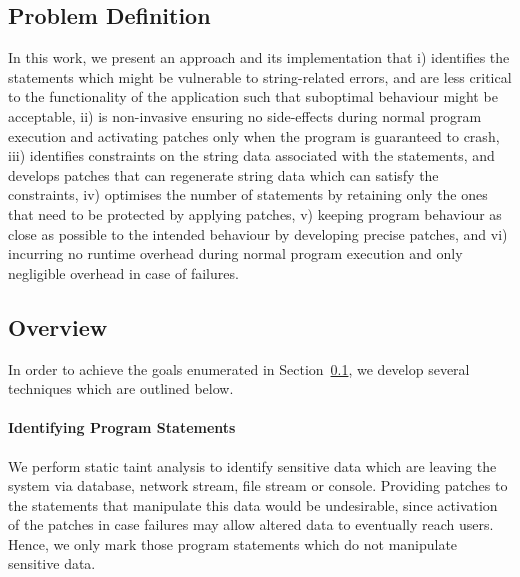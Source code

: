 \subsection{Problem Definition}
\label{subsec:problem}

In this work, we present an approach and its implementation that i) identifies the statements which might be vulnerable to string-related errors,
and are less critical to the functionality of the application such that suboptimal behaviour might be acceptable, ii) is non-invasive ensuring no 
side-effects during normal program execution and activating patches only when the program is guaranteed to crash, iii) identifies constraints on the string
data associated with the statements, and develops patches that can regenerate string data which can satisfy the constraints, iv) optimises the
number of statements by retaining only the ones that need to be protected by applying patches,  v) keeping program behaviour as close as possible to the
intended behaviour by developing precise patches, and vi) incurring no runtime overhead during normal program execution and only negligible overhead in case of failures.

\subsection{Overview}
\label{subsec:overview}

In order to achieve the goals enumerated in Section~\ref{subsec:problem}, we develop
several techniques which are outlined below.

\paragraph{Identifying Program Statements} We perform static taint analysis
to identify sensitive data which are leaving the system via database, network
stream, file stream or console. Providing patches to the
statements that manipulate this data would be undesirable, since
activation of the patches in case failures may allow altered data to eventually reach
users. Hence, we only mark those program statements which do not manipulate
sensitive data.


